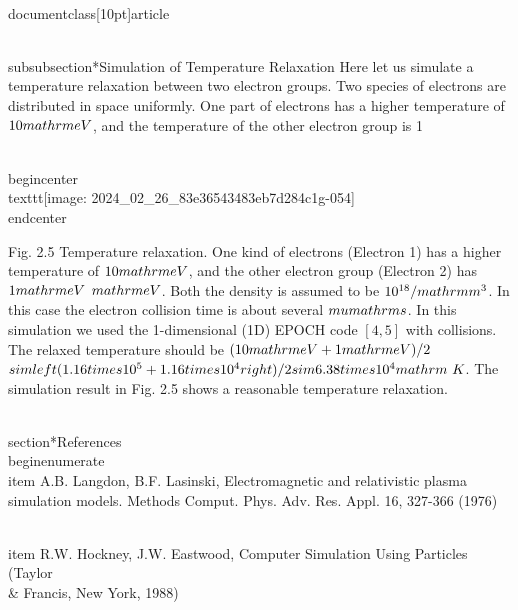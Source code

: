 \\documentclass[10pt]{article}
\begin{document}
\\subsubsection*{Simulation of Temperature Relaxation}
Here let us simulate a temperature relaxation between two electron groups. Two species of electrons are distributed in space uniformly. One part of electrons has a higher temperature of $10 \\mathrm{eV}$, and the temperature of the other electron group is 1

\\begin{center}
\\texttt{[image: 2024\_02\_26\_83e36543483eb7d284c1g-054]}
\\end{center}

Fig. 2.5 Temperature relaxation. One kind of electrons (Electron 1) has a higher temperature of $10 \\mathrm{eV}$, and the other electron group (Electron 2) has $1 \\mathrm{eV}$
$\\mathrm{eV}$. Both the density is assumed to be $10^{18} / \\mathrm{m}^{3}$. In this case the electron collision time is about several $\\mu \\mathrm{s}$. In this simulation we used the 1-dimensional (1D) EPOCH code $[4,5]$ with collisions. The relaxed temperature should be $(10 \\mathrm{eV}+1 \\mathrm{eV}) / 2$ $\\sim\\left(1.16 \\times 10^{5}+1.16 \\times 10^{4}\\right) / 2 \\sim 6.38 \\times 10^{4} \\mathrm{~K}$. The simulation result in Fig. 2.5 shows a reasonable temperature relaxation.

\\section*{References}
\\begin{enumerate}
  \\item A.B. Langdon, B.F. Lasinski, Electromagnetic and relativistic plasma simulation models. Methods Comput. Phys. Adv. Res. Appl. 16, 327-366 (1976)

  \\item R.W. Hockney, J.W. Eastwood, Computer Simulation Using Particles (Taylor \\& Francis, New York, 1988)
\end{document}
